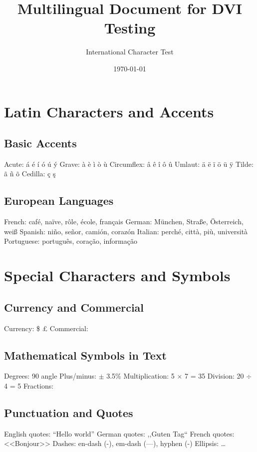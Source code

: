 \documentclass[12pt]{article}
\title{Multilingual Document for DVI Testing}
\author{International Character Test}
\date{\today}
\begin{document}
\maketitle

\section{Latin Characters and Accents}

\subsection{Basic Accents}
Acute: \'a \'e \'i \'o \'u \'y
Grave: \`a \`e \`i \`o \`u
Circumflex: \^a \^e \^i \^o \^u
Umlaut: \"a \"e \"i \"o \"u \"y
Tilde: \~a \~n \~o
Cedilla: \c{c} \c{s}

\subsection{European Languages}
French: caf\'e, na\"ive, r\^ole, \'ecole, fran\c{c}ais
German: M\"unchen, Stra\ss{}e, \"Osterreich, wei\ss{}
Spanish: ni\~no, se\~nor, cami\'on, coraz\'on
Italian: perch\'e, citt\`a, pi\`u, universit\`a
Portuguese: portugu\^es, cora\c{c}\~ao, informa\c{c}\~ao

\section{Special Characters and Symbols}

\subsection{Currency and Commercial}
Currency: \$ \pounds{} \textyen{} \texteuro{} \textcent{}
Commercial: \textcopyright{} \textregistered{} \texttrademark{} \textparagraph{} \textsection{}

\subsection{Mathematical Symbols in Text}
Degrees: 90\textdegree{} angle
Plus/minus: $\pm$ 3.5\%
Multiplication: 5 $\times$ 7 = 35
Division: 20 $\div$ 4 = 5
Fractions: \textonehalf{} \textonequarter{} \textthreequarters{}

\subsection{Punctuation and Quotes}
English quotes: ``Hello world''
German quotes: ,,Guten Tag``
French quotes: <<Bonjour>>
Dashes: en-dash (-), em-dash (---), hyphen (-)
Ellipsis: \ldots{}
\end{document}
